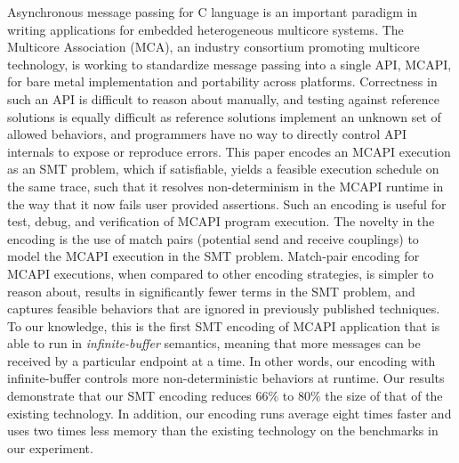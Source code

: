 Asynchronous message passing for C language is an important paradigm in writing
applications for embedded heterogeneous multicore systems.  The
Multicore Association (MCA), an industry consortium promoting
multicore technology, is working to standardize message passing into a
single API, MCAPI, for bare metal implementation and portability
across platforms.  Correctness in such an API is difficult to reason
about manually, and testing against reference solutions is equally
difficult as reference solutions implement an unknown set of allowed
behaviors, and programmers have no way to directly control API
internals to expose or reproduce errors.  This paper encodes an MCAPI
execution as an SMT problem, which if satisfiable, yields a feasible
execution schedule on the same trace,
such that it resolves non-determinism in the MCAPI runtime in the way that it now fails user provided assertions.
Such an encoding is useful for test, debug, and
verification of MCAPI program execution.  The novelty in the encoding
is the use of match pairs (potential send and receive couplings) to
model the MCAPI execution in the SMT problem.  Match-pair encoding for
MCAPI executions, when compared to other encoding strategies, is
simpler to reason about, results in significantly fewer terms in the
SMT problem, and captures feasible behaviors that are ignored in
previously published techniques. To our knowledge, this is the first SMT encoding of MCAPI application that is able to run in \textit{infinite-buffer} semantics, meaning that more messages can be received by a particular endpoint at a time. In other words, our encoding with infinite-buffer controls more non-deterministic behaviors at runtime. Our results demonstrate that our SMT encoding reduces $66\%$ to $80\%$ the size of that of the existing technology. In addition, our encoding runs average eight times faster and uses two times less memory than the existing technology on the benchmarks in our experiment.

